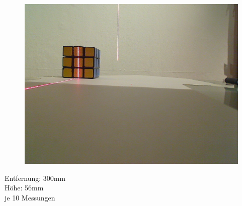\documentclass[xcolor=dvipsnames]{beamer}
\begin{document}
\begin{frame}
\begin{figure}
\begin{minipage}{0.32\linewidth}
			\includegraphics[width=\linewidth]{includes/test_color_3}
		\end{minipage}
	\end{figure}

	Entfernung: 300mm\\
	Höhe: 56mm\\
	je 10 Messungen

\end{frame}
\end{document}
